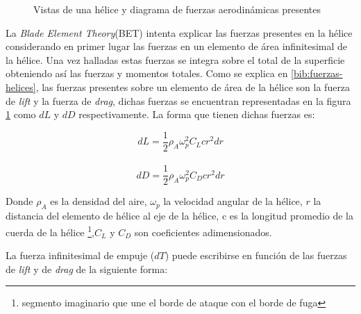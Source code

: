 \documentclass[main]{subfiles}
\begin{document}
\begin{figure} [h!]
  \centering
  \caption{Vistas de una h\'elice y diagrama de fuerzas aerodin\'amicas presentes}
  \label{fig:helice}
\end{figure}

La \emph{Blade Element Theory}(BET) intenta explicar las fuerzas presentes en la h\'elice considerando en primer lugar las fuerzas en un elemento de \'area infinitesimal de la h\'elice. Una vez halladas estas fuerzas se integra sobre el total de la superficie obteniendo as\'i las fuerzas y momentos totales. Como se explica en \ref{bib:fuerzas-helices}, las fuerzas presentes sobre un elemento de \'area de la h\'elice son la fuerza de \emph{lift} y la fuerza de \emph{drag}, dichas fuerzas se encuentran representadas en la figura \ref{fig:helice} como $dL$ y $dD$ respectivamente. La forma que tienen dichas fuerzas es:

$$
dL=\frac{1}{2}\rho_A \omega_p^2 C_L c r^2dr$$\\

$$
dD=\frac{1}{2}\rho_A \omega_p^2 C_D c r^2dr
$$

Donde $\rho_A$ es la densidad del aire, $\omega_p$ la velocidad angular de la h\'elice, $r$ la distancia del elemento de h\'elice al eje de la h\'elice, c es la longitud promedio de la cuerda de la h\'elice \footnote{segmento imaginario que une el borde de ataque con el borde de fuga },$ C_L$ y $C_D$ son coeficientes adimensionados.

La fuerza infinitesimal de empuje ($dT$) puede escribirse en funci\'on de las fuerzas de \emph{lift} y de \emph{drag} de la siguiente forma:
\end{document}
